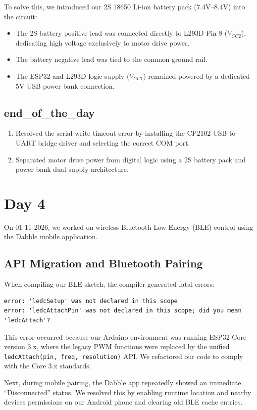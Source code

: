\documentclass[11pt,a4paper]{article}
\begin{document}
To solve this, we introduced our 2S 18650 Li-ion battery pack ($7.4\text{V}\text{--}8.4\text{V}$) into the circuit:
\begin{itemize}
    \item The 2S battery positive lead was connected directly to L293D Pin 8 ($V_{CC2}$), dedicating high voltage exclusively to motor drive power.
    \item The battery negative lead was tied to the common ground rail.
    \item The ESP32 and L293D logic supply ($V_{CC1}$) remained powered by a dedicated $5\text{V}$ USB power bank connection.
\end{itemize}

\subsection{end\_of\_the\_day}
\begin{enumerate}
    \item Resolved the serial write timeout error by installing the CP2102 USB-to-UART bridge driver and selecting the correct COM port.
    \item Separated motor drive power from digital logic using a 2S battery pack and power bank dual-supply architecture.
\end{enumerate}

\section{Day 4}
On 01-11-2026, we worked on wireless Bluetooth Low Energy (BLE) control using the Dabble mobile application.

\subsection*{API Migration and Bluetooth Pairing}
When compiling our BLE sketch, the compiler generated fatal errors:
\begin{verbatim}
error: 'ledcSetup' was not declared in this scope
error: 'ledcAttachPin' was not declared in this scope; did you mean 'ledcAttach'?
\end{verbatim}
This error occurred because our Arduino environment was running ESP32 Core version 3.x, where the legacy PWM functions were replaced by the unified \texttt{ledcAttach(pin, freq, resolution)} API. We refactored our code to comply with the Core 3.x standards.

Next, during mobile pairing, the Dabble app repeatedly showed an immediate ``Disconnected'' status. We resolved this by enabling runtime location and nearby devices permissions on our Android phone and clearing old BLE cache entries.
\end{document}

